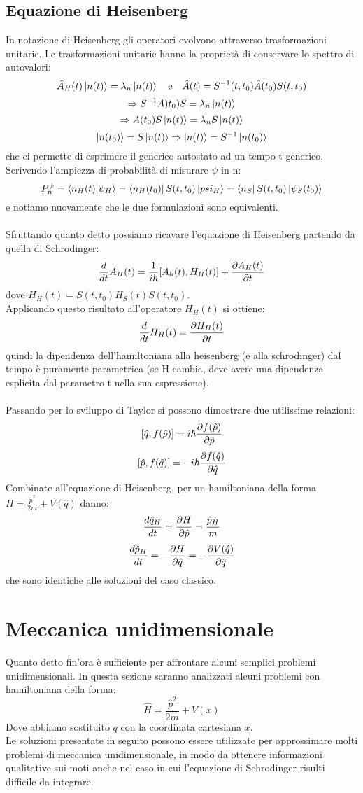 \documentclass{article}
\begin{document}
\subsection{Equazione di Heisenberg}
In notazione di Heisenberg gli operatori evolvono attraverso trasformazioni unitarie. Le trasformazioni unitarie hanno la proprietà di conservare lo spettro di autovalori:
$$ \hat{A}_H(t)\ket{n(t)} = \lambda_n\ket{n(t)} \quad \text{e} \quad \hat{A}(t)=S^{-1}(t,t_0)\hat{A}(t_0)S(t,t_0)$$
$$\Rightarrow S^{-1}A)t_0)S=\lambda_n\ket{n(t)}$$
$$\Rightarrow A(t_0)S\ket{n(t)}=\lambda_nS\ket{n(t)}$$
$$ \ket{n(t_0)}=S\ket{n(t)}\Rightarrow\ket{n(t)}=S^{-1}\ket{n(t_0)} $$
che ci permette di esprimere il generico autostato ad un tempo t generico.\\
Scrivendo l'ampiezza di probabilità di misurare $\psi$ in n:
$$ P^\psi_n=\bra{n_H(t)}\ket{\psi_H}=\bra{n_H(t_0)}S(t,t_0)\ket{psi_H}=\bra{n_S}S(t,t_0)\ket{\psi_S(t_0)} $$
e notiamo nuovamente che le due formulazioni sono equivalenti.\\\\
Sfruttando quanto detto possiamo ricavare l'equazione di Heisenberg partendo da quella di Schrodinger:
$$ \frac{d}{dt}A_H(t)=\frac{1}{i\hbar}[A_h(t),H_H(t)]+\pdv{A_H(t)}{t} $$
dove $H_H(t)=S(t,t_0)H_S(t)S(t,t_0)$.\\
Applicando questo risultato all'operatore  $H_H(t)$ si ottiene:
$$\frac{d}{dt}H_H(t)=\pdv{H_H(t)}{t}$$
quindi la dipendenza dell'hamiltoniana alla heisenberg (e alla schrodinger) dal tempo è puramente parametrica (se H cambia, deve avere una dipendenza esplicita dal parametro t nella sua espressione).\\\\
Passando per lo sviluppo di Taylor si possono dimostrare due utilissime relazioni:
$$ [\hat{q},f(\hat{p})]=i\hbar\pdv{f(\hat{p})}{\hat{p}} $$
$$ [\hat{p},f(\hat{q})]=-i\hbar\pdv{f(\hat{q})}{\hat{q}} $$
Combinate all'equazione di Heisenberg, per un hamiltoniana della forma $H=\frac{\hat{p}^2}{2m}+V(\hat{q})$ danno:
$$\frac{d\hat{q}_H}{dt}=\pdv{H}{\hat{p}}=\frac{\hat{p}_H}{m}$$
$$\frac{d\hat{p}_H}{dt}=-\pdv{H}{\hat{q}}=-\pdv{V(\hat{q})}{\hat{q}}$$
che sono identiche alle soluzioni del caso classico.

\newpage
\section{Meccanica unidimensionale}
Quanto detto fin'ora è sufficiente per affrontare alcuni semplici problemi unidimensionali. In questa sezione saranno analizzati alcuni problemi con hamiltoniana della forma:
$$\hat{H}=\frac{\hat{p}^2}{2m}+V(x)$$
Dove abbiamo sostituito $q$ con la coordinata cartesiana $x$.\\
Le soluzioni presentate in seguito possono essere utilizzate per approssimare molti problemi di meccanica unidimensionale, in modo da ottenere informazioni qualitative sui moti anche nel caso in cui l'equazione di Schrodinger risulti difficile da integrare.
\end{document}
